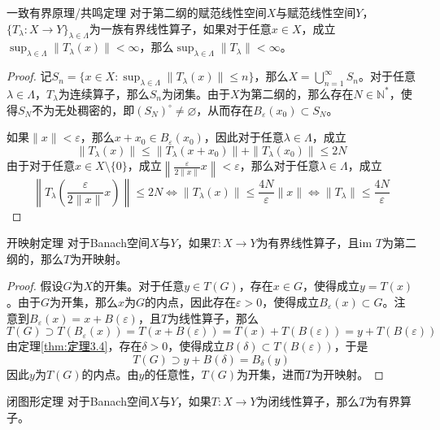 \documentclass[lang = cn, scheme = chinese, thmcnt = section]{elegantbook}
\newcommand{\N}{\mathbb{N}}            %
\newcommand{\sub}{\subset}             %
\newcommand{\im}{\text{im }}           %
\begin{document}
\begin{theorem}{一致有界原理/共鸣定理}
	对于第二纲的赋范线性空间$X$与赋范线性空间$Y$，$\{ T_\lambda:X\to Y \}_{\lambda\in\Lambda}$为一族有界线性算子，如果对于任意$x\in X$，成立$\displaystyle \sup_{\lambda\in\Lambda}\|T_\lambda(x)\|<\infty$，那么$\displaystyle \sup_{\lambda\in\Lambda}\|T_\lambda\|<\infty$。
\end{theorem}

\begin{proof}
	记$\displaystyle S_n=\{ x\in X:\sup_{\lambda\in\Lambda}\|T_\lambda(x)\|\le n \}$，那么$\displaystyle X=\bigcup_{n=1}^{\infty}S_n$。对于任意$\lambda\in\Lambda$，$T_\lambda$为连续算子，那么$S_n$为闭集。由于$X$为第二纲的，那么存在$N\in\N^*$，使得$S_N$不为无处稠密的，即$(S_N)^\circ\ne\varnothing$，从而存在$B_\varepsilon(x_0)\sub S_N$。
	
	如果$\|x\|<\varepsilon$，那么$x+x_0\in B_\varepsilon(x_0)$，因此对于任意$\lambda\in\Lambda$，成立
	$$
	\|T_\lambda(x)\|\le \|T_\lambda(x+x_0)\|+\|T_\lambda(x_0)\|\le 2N
	$$
	由于对于任意$x\in X\setminus\{0\}$，成立$\displaystyle \left\| \frac{\varepsilon}{2\|x\|}x \right\|<\varepsilon$，那么对于任意$\lambda\in\Lambda$，成立
	$$
	\left\| T_\lambda\left( \frac{\varepsilon}{2\|x\|}x \right) \right\|\le 2N
	\iff 
	\|T_\lambda(x)\|\le\frac{4N}{\varepsilon}\|x\|
	\iff 
	\|T_\lambda\|\le\frac{4N}{\varepsilon}
	$$
\end{proof}

\begin{theorem}{开映射定理}
	对于Banach空间$X$与$Y$，如果$T:X\to Y$为有界线性算子，且$\im T$为第二纲的，那么$T$为开映射。
\end{theorem}

\begin{proof}
	假设$G$为$X$的开集。对于任意$y\in T(G)$，存在$x\in G$，使得成立$y=T(x)$。由于$G$为开集，那么$x$为$G$的内点，因此存在$\varepsilon>0$，使得成立$B_\varepsilon(x)\sub G$。注意到$B_\varepsilon(x)=x+B(\varepsilon)$，且$T$为线性算子，那么
	$$
	T(G)\supset T(B_\varepsilon(x))=T(x+B(\varepsilon))=T(x)+T(B(\varepsilon))=y+T(B(\varepsilon))
	$$
	由定理\ref{thm:定理3.4}，存在$\delta>0$，使得成立$B(\delta)\sub T(B(\varepsilon))$，于是
	$$
	T(G)\supset y+B(\delta)=B_{\delta}(y)
	$$
	因此$y$为$T(G)$的内点。由$y$的任意性，$T(G)$为开集，进而$T$为开映射。
\end{proof}

\begin{theorem}{闭图形定理}
	对于Banach空间$X$与$Y$，如果$T:X\to Y$为闭线性算子，那么$T$为有界算子。
\end{theorem}
\end{document}
